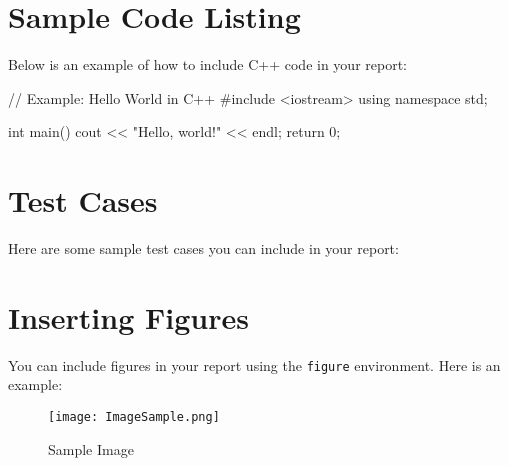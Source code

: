 \documentclass{style}
\begin{document}
\section{Sample Code Listing}
Below is an example of how to include C++ code in your report:

\begin{codelisting}
// Example: Hello World in C++
#include <iostream>
using namespace std;

int main() {
    cout << "Hello, world!" << endl;
    return 0;
}
\end{codelisting}

\section{Test Cases}
Here are some sample test cases you can include in your report:
\begin{testcase}
\end{testcase}

\section{Inserting Figures}
You can include figures in your report using the \texttt{figure} environment. Here is an example:   
\begin{figure}[h]
    \centering
    \texttt{[image: ImageSample.png]} %
    \caption{Sample Image}
    \label{fig:sample-figure}
\end{figure}
\end{document}
